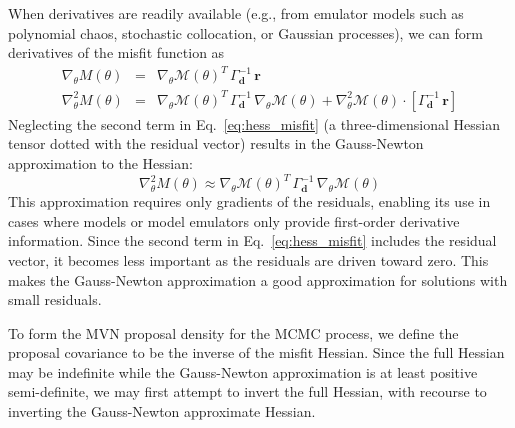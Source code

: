 When derivatives are readily available (e.g., from emulator models such
as polynomial chaos, stochastic collocation, or Gaussian processes),
we can form derivatives of the misfit function as
\begin{eqnarray}
\nabla_\theta M(\theta) &=& \nabla_\theta \mathcal{M}(\theta)^T\,\Gamma_{\mathbf{d}}^{-1}\,\boldsymbol{r} \label{eq:grad_misfit} \\
\nabla^2_\theta M(\theta) &=& \nabla_\theta \mathcal{M}(\theta)^T\,\Gamma_{\mathbf{d}}^{-1}\,\nabla_\theta \mathcal{M}(\theta) + \nabla^2_\theta \mathcal{M}(\theta) \cdot \left[\Gamma_{\mathbf{d}}^{-1}\,\boldsymbol{r}\right] \label{eq:hess_misfit} 
\end{eqnarray}
Neglecting the second term in Eq.~\ref{eq:hess_misfit} (a
three-dimensional Hessian tensor dotted with the residual vector)
results in the Gauss-Newton approximation to the Hessian:
\begin{equation}
\nabla^2_\theta M(\theta) \approx \nabla_\theta \mathcal{M}(\theta)^T\,\Gamma_{\mathbf{d}}^{-1}\,\nabla_\theta \mathcal{M}(\theta) \label{eq:hess_misfit_gn}
\end{equation}
This approximation requires only gradients of the residuals, enabling
its use in cases where models or model emulators only provide
first-order derivative information.  Since the second term in
Eq.~\ref{eq:hess_misfit} includes the residual vector, it becomes less
important as the residuals are driven toward zero.  This makes the
Gauss-Newton approximation a good approximation for solutions with
small residuals.

To form the MVN proposal density for the MCMC process, we define the
proposal covariance to be the inverse of the misfit Hessian.  Since
the full Hessian may be indefinite while the Gauss-Newton
approximation is at least positive semi-definite, we may first attempt
to invert the full Hessian, with recourse to inverting the
Gauss-Newton approximate Hessian.

